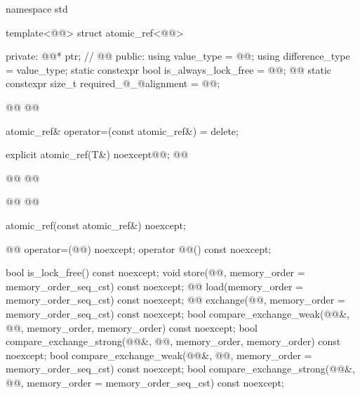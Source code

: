 \begin{codeblock}
namespace std {
  template<@@> struct atomic_ref<@@> {
  private:
    @@* ptr;  // \expos
    @@
  public:
    using value_type = @@;
    using difference_type = value_type;
    static constexpr bool is_always_lock_free = @@;
    @@
    static constexpr size_t required_@_@alignment = @@;

    @@
    @@

    atomic_ref& operator=(const atomic_ref&) = delete;

    explicit atomic_ref(T&) noexcept@@;
    @@
    
    @@
    @@
    
    @@
    @@

    atomic_ref(const atomic_ref&) noexcept;

    @@ operator=(@@) noexcept;
    operator @@() const noexcept;

    bool is_lock_free() const noexcept;
    void store(@@, memory_order = memory_order_seq_cst) const noexcept;
    @@ load(memory_order = memory_order_seq_cst) const noexcept;
    @@ exchange(@@,
                            memory_order = memory_order_seq_cst) const noexcept;
    bool compare_exchange_weak(@@&, @@,
                               memory_order, memory_order) const noexcept;
    bool compare_exchange_strong(@@&, @@,
                                 memory_order, memory_order) const noexcept;
    bool compare_exchange_weak(@@&, @@,
                               memory_order = memory_order_seq_cst) const noexcept;
    bool compare_exchange_strong(@@&, @@,
                                 memory_order = memory_order_seq_cst) const noexcept;

}}
\end{codeblock}
